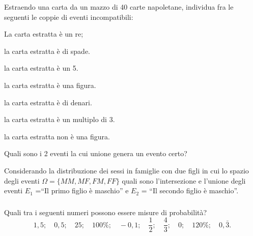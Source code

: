 \newpage
\begin{esercizio}
 \label{ese:9.4}
Estraendo una carta da un mazzo di 40 carte napoletane, individua fra le 
seguenti le coppie di eventi incompatibili:
\begin{multicols}{2}
\begin{enumeratea}
\item La carta estratta è un re;
\item la carta estratta è di spade.
\item la carta estratta è un 5.
\item la carta estratta è una figura.
\item la carta estratta è di denari.
\item la carta estratta è un multiplo di 3.
\item la carta estratta non è una figura.
\end{enumeratea}
\end{multicols}
Quali sono i 2 eventi la cui unione genera un evento certo?
\end{esercizio}

\begin{esercizio}
 \label{ese:9.5}
 Considerando la distribuzione dei sessi in famiglie con due figli in cui lo 
spazio degli eventi \(\Omega =\{{MM}, {MF}, {FM}, {FF}\}\) quali sono 
l'intersezione e l'unione degli eventi \(E_1\) =``Il primo figlio è maschio'' e 
\(E_2\) = ``Il secondo figlio è maschio''.
\end{esercizio}

\subsubsection*{}

\begin{esercizio}
 \label{ese:9.6}
Quali tra i seguenti numeri possono essere misure di probabilità? 
\[1,5;\quad 0,5;\quad 25;\quad 100\%;\quad -0,1;\quad \frac 1 2;\quad 
\frac 4 3;\quad 0;\quad 120\%;\quad 0,\bar 3. \]
\end{esercizio}


